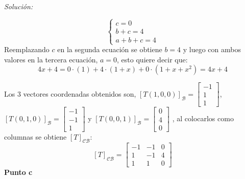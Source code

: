 \documentclass{article}
\newenvironment{solution}
    {\textit{Solución:}}
    {}
\begin{document}
\begin{solution}
\begin{enumerate}
\[\begin{cases}
c = 0 \\
b+c = 4 \\
a+b+c = 4
\end{cases}
\]
Reemplazando $c$ en la segunda ecuación se obtiene $b=4$ y luego con ambos valores en la tercera ecuación, $a = 0$, esto quiere decir que:
\[
4x+4 = 0 \cdot (1) + 4\cdot (1+x) + 0 \cdot (1+x+x^2) = 4x + 4
\]
\end{enumerate}
Los 3 vectores coordenadas obtenidos son, $[T(1,0,0)]_{\mathcal{B}} = \begin{bmatrix} -1 \\ 1 \\ 1 \end{bmatrix}$, $[T(0,1,0)]_{\mathcal{B}} = \begin{bmatrix} -1 \\ -1 \\ 1 \end{bmatrix}$ y $[T(0,0,1)]_{\mathcal{B}} = \begin{bmatrix} 0 \\ 4 \\ 0 \end{bmatrix}$  , al colocarlos como columnas se obtiene $[T]_{\mathcal{CB}}$:
\[
[T]_{\mathcal{CB}} = \begin{bmatrix}
-1 & -1 & 0 \\
1 & -1 & 4 \\
1 & 1 & 0
\end{bmatrix}
\]
\textbf{Punto c}


\end{solution}
\end{document}
